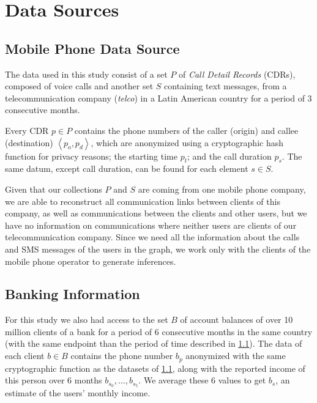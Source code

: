 \section{Data Sources}
\label{sec:data_sources}

\subsection{Mobile Phone Data Source}
\label{subsec:telcoinformation}

The data used in this study consist of a set $P$ of \textit{Call Detail Records} (CDRs), composed of voice calls and another set $S$ containing text messages, from a telecommunication company (\textit{telco}) in a Latin American country for a period of 3 consecutive months.

Every CDR $p \in P$ contains the phone numbers of the caller (origin) and callee (destination) $\left< p_o, p_d \right>$, which are anonymized using a cryptographic hash function for privacy reasons; the starting time \( p_t \); and the call duration \( p_s \). The same datum, except call duration, can be found for each element $s \in S$.

Given that our collections $P$ and $S$ are coming from one mobile phone company, we are able to reconstruct all communication links between clients of this company, as well as communications between the clients and other users, but we have no information on communications where neither users are clients of our telecommunication company. Since we need all the information about the calls and SMS messages of the users in the graph, we work only with the clients of the mobile phone operator to generate inferences.

\subsection{Banking Information}

For this study we also had access to the set $B$ of account balances of over 10 million clients of a bank for a period of 6 consecutive months in the same country (with the same endpoint than the period of time described in \cref{subsec:telcoinformation}). The data of each client $b \in B$ contains the phone number $b_p$ anonymized with the same cryptographic function as the datasets of \cref{subsec:telcoinformation}, along with the reported income of this person over 6 months $b_{s_0}, \ldots, b_{s_5}$. We average these 6 values to get $b_s$, an estimate of the users' monthly income.

